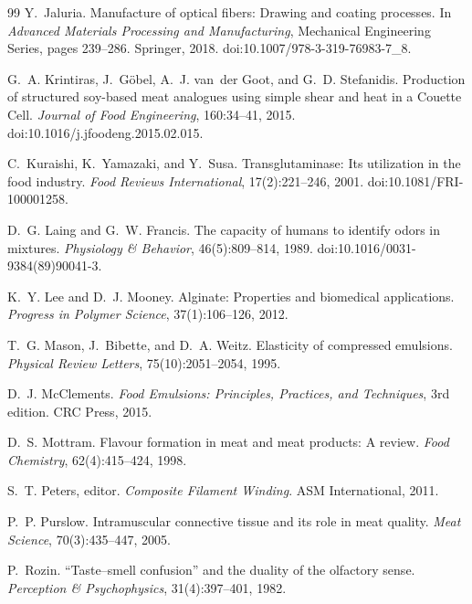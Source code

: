 \documentclass[11pt,openany]{book}
\theoremstyle{definition}
\begin{document}
\begin{thebibliography}{99}
Y.~Jaluria.
\newblock Manufacture of optical fibers: Drawing and coating processes.
\newblock In \emph{Advanced Materials Processing and Manufacturing}, Mechanical Engineering Series, pages 239--286. Springer, 2018.
\newblock doi:10.1007/978-3-319-76983-7\_8.

G.~A. Krintiras, J.~Göbel, A.~J. van~der Goot, and G.~D. Stefanidis.
\newblock Production of structured soy-based meat analogues using simple shear and heat in a Couette Cell.
\newblock \emph{Journal of Food Engineering}, 160:34--41, 2015.
\newblock doi:10.1016/j.jfoodeng.2015.02.015.

C.~Kuraishi, K.~Yamazaki, and Y.~Susa.
\newblock Transglutaminase: Its utilization in the food industry.
\newblock \emph{Food Reviews International}, 17(2):221--246, 2001.
\newblock doi:10.1081/FRI-100001258.

D.~G. Laing and G.~W. Francis.
\newblock The capacity of humans to identify odors in mixtures.
\newblock \emph{Physiology \& Behavior}, 46(5):809--814, 1989.
\newblock doi:10.1016/0031-9384(89)90041-3.

K.~Y. Lee and D.~J. Mooney.
\newblock Alginate: Properties and biomedical applications.
\newblock \emph{Progress in Polymer Science}, 37(1):106--126, 2012.

T.~G. Mason, J.~Bibette, and D.~A. Weitz.
\newblock Elasticity of compressed emulsions.
\newblock \emph{Physical Review Letters}, 75(10):2051--2054, 1995.

D.~J. McClements.
\newblock \emph{Food Emulsions: Principles, Practices, and Techniques}, 3rd edition.
\newblock CRC Press, 2015.

D.~S. Mottram.
\newblock Flavour formation in meat and meat products: A review.
\newblock \emph{Food Chemistry}, 62(4):415--424, 1998.

S.~T. Peters, editor.
\newblock \emph{Composite Filament Winding}.
\newblock ASM International, 2011.

P.~P. Purslow.
\newblock Intramuscular connective tissue and its role in meat quality.
\newblock \emph{Meat Science}, 70(3):435--447, 2005.

P.~Rozin.
\newblock ``Taste--smell confusion'' and the duality of the olfactory sense.
\newblock \emph{Perception \& Psychophysics}, 31(4):397--401, 1982.


\end{thebibliography}
\end{document}
